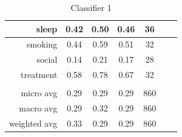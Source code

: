 \documentclass[11pt]{article}
\begin{document}
\begin{table}[htb]
\begin{center}
\begin{tabular}{ |r|c|c|c|c|c|c| }
sleep 			&  0.42 & 0.50 & 0.46 &   36\\ \hline 
smoking 		&  0.44 & 0.59 & 0.51 &   32\\ \hline 
social 			&  0.14 & 0.21 & 0.17 &   28\\ \hline 
treatment 		&  0.58 & 0.78 & 0.67 &   32\\ \hline 
\\ \hline 
micro avg 		&  0.29 & 0.29 & 0.29 &  860\\ \hline 
macro avg 		&  0.29 & 0.32 & 0.29 &  860\\ \hline 
weighted avg 	&  0.33 & 0.29 & 0.29 &  860\\ \hline
\end{tabular}
\caption{Classifier 1}
\end{center}
\end{table}
\FloatBarrier
\end{document}
